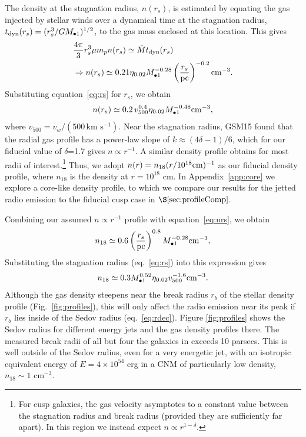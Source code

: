 \documentclass[usenatbib,fleqn]{mnras}
\newcommand{\Mbh}[1][]{M_{\bullet1}}
\newcommand{\rs}{r_s}
\begin{document}
The density at the stagnation radius, $n(\rs)$, is estimated by
equating the gas injected by stellar winds over a dynamical time at
the stagnation radius, $t_{\rm dyn} (\rs)=(\rs^3/G \Mbh)^{1/2}$, to
the gas mass enclosed at this location.  This gives
\begin{align}
  &\frac{4 \pi}{3} \rs^3 \mu m_p n(r_s) \simeq \dot{M} t_{\rm dyn}
  (\rs) \nonumber\\
  &\Rightarrow n(r_s) \simeq 0.21 \eta_{0.02} \Mbh[,7]^{-0.28} \left(\frac{r_s}{\rm
      pc}\right)^{-0.2} {\rm cm}^{-3}.
\label{eq:nrs}
\end{align}
%
Substituting equation~\eqref{eq:rs} for $r_s$, we obtain 
\begin{equation}
n(r_s) \simeq 0.2 \, v_{500}^{0.4} \eta_{0.02} \Mbh[,7]^{-0.48} {\rm cm}^{-3},
\label{eq:nrs2}
\end{equation}
where $v_{500}=v_w/\left(500 \,\mathrm{km\,\,
    s^{-1}}\right)$. 
%
Near the stagnation radius, GSM15 found that the radial gas profile
has a power-law slope of $k \approx (4\delta-1)/6$, which for our
fiducial value of $\delta$=1.7 gives $n \propto r^{-1}$.  A similar
density profile obtains for most radii of interest.\footnote{For cusp
  galaxies, the gas velocity asymptotes to a constant value between
  the stagnation radius and break radius (provided they are
  sufficiently far apart). In this region we instead expect $n\propto
  r^{1-\delta}$.}  Thus, we adopt $n(r)= n_{18} (r/10^{18} {\rm
  cm})^{-1}$ as our fiducial density profile, where $n_{18}$ is the
density at $r = 10^{18}$ cm.  In Appendix~\ref{app:core} we explore a
core-like density profile, to which we compare our results for the
jetted radio emission to the fiducial cusp case in
$\S\ref{sec:profileComp}$.

Combining our assumed $n\propto r^{-1}$ profile with
equation~\eqref{eq:nrs}, we obtain
\begin{equation}
  n_{18}\simeq 0.6 \left(\frac{r_s}{\rm pc}\right)^{0.8}
  \Mbh[,7]^{-0.28} {\rm cm^{-3}},
  \label{eq:n18}
\end{equation}
%
Substituting the stagnation radius (eq.~\ref{eq:rs}) into this
expression gives
\begin{equation}
n_{18}\simeq 0.3 \Mbh[,7]^{0.52} \eta_{0.02} v_{500}^{-1.6} {\rm
  cm^{-3}}.
\label{eq:n182}
\end{equation} 
%
Although the gas density steepens near the break radius $r_b$ of the
stellar density profile (Fig.~\ref{fig:profiles}), this will only
affect the radio emission near its peak if $r_b$ lies inside of the
Sedov radius (eq.~\ref{eq:rdec}).  Figure \ref{fig:profiles} shows the Sedov
radius for different energy jets and the gas density profiles there.
The measured break radii of all but four the galaxies in
\citet{Lauer+2007} exceeds 10 parsecs.  This is well outside of the
Sedov radius, even for a very energetic jet, with an isotropic
equivalent energy of $E=4\times 10^{54}$ erg in a CNM of particularly
low density, $n_{18} \sim 1$ cm$^{-3}$.  
\end{document}
